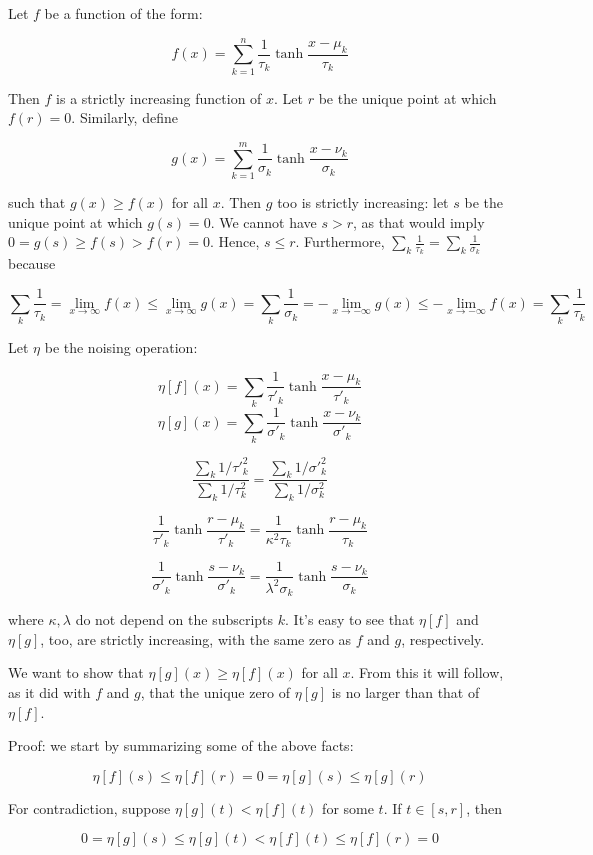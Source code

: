 \documentclass{article}
\begin{document}
Let $f$ be a function of the form:

\[f(x) = \sum_{k=1}^n \frac{1}{\tau_k} \tanh \frac {x-\mu_k} {\tau_k}\]

Then $f$ is a strictly increasing function of $x$. Let $r$ be the unique point at which $f(r) = 0$. Similarly, define

\[g(x) = \sum_{k=1}^m \frac{1}{\sigma_k} \tanh \frac {x-\nu_k} {\sigma_k}\]

such that $g(x) \ge f(x)$ for all $x$. Then $g$ too is strictly increasing: let $s$ be the unique point at which $g(s) = 0$. We cannot have $s > r$, as that would imply $0 = g(s) \ge f(s) > f(r) = 0$. Hence, $s \le r$. Furthermore, $\sum_k \frac{1}{\tau_k} = \sum_k \frac{1}{\sigma_k}$ because

\[\sum_k \frac{1}{\tau_k}
= \lim_{x\rightarrow\infty} f(x)
\le \lim_{x\rightarrow\infty} g(x)
= \sum_k \frac{1}{\sigma_k}
= -\lim_{x\rightarrow -\infty} g(x)
\le -\lim_{x\rightarrow -\infty} f(x)
= \sum_k \frac{1}{\tau_k}\]

Let $\eta$ be the noising operation:

\[\eta[f](x) = \sum_k \frac{1}{\tau'_k} \tanh \frac {x-\mu_k} {\tau'_k}\]
\[\eta[g](x) = \sum_k \frac{1}{\sigma'_k} \tanh \frac {x-\nu_k} {\sigma'_k}\]

\[ \frac{\sum_k 1 / \tau'^2_k}{\sum_k 1 / \tau^2_k} = \frac{\sum_k 1 / \sigma'^2_k}{\sum_k 1 / \sigma^2_k} \]

\[\frac{1}{\tau'_k} \tanh \frac {r-\mu_k} {\tau'_k}
= \frac{1}{\kappa^2\tau_k} \tanh \frac {r-\mu_k} {\tau_k}\]

\[\frac{1}{\sigma'_k} \tanh \frac {s-\nu_k} {\sigma'_k}
= \frac{1}{\lambda^2\sigma_k} \tanh \frac {s-\nu_k} {\sigma_k}\]

where $\kappa,\lambda$ do not depend on the subscripts $k$. It's easy to see that $\eta[f]$ and $\eta[g]$, too, are strictly increasing, with the same zero as $f$ and $g$, respectively.

We want to show that $\eta[g](x) \ge \eta[f](x)$ for all $x$. From this it will follow, as it did with $f$ and $g$, that the unique zero of $\eta[g]$ is no larger than that of $\eta[f]$.

Proof: we start by summarizing some of the above facts:

\[ \eta[f](s) \le \eta[f](r) = 0 = \eta[g](s) \le \eta[g](r) \]

For contradiction, suppose $\eta[g](t) < \eta[f](t)$ for some $t$. If $t\in [s,r]$, then

\[ 0 = \eta[g](s) \le \eta[g](t) < \eta[f](t) \le \eta[f](r) = 0 \]
\end{document}
